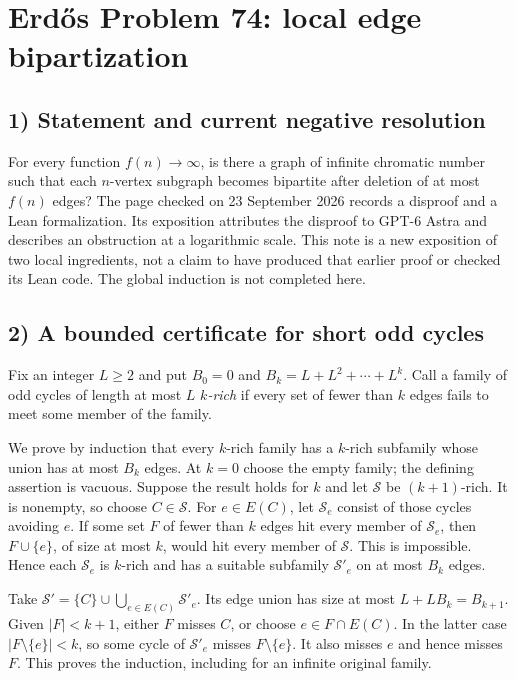 \section{Erd\H{o}s Problem 74: local edge bipartization}

\subsection{1) Statement and current negative resolution}
For every function $f(n)\to\infty$, is there a graph of infinite
chromatic number such that each $n$-vertex subgraph becomes bipartite
after deletion of at most $f(n)$ edges?
The page checked on 23 September 2026 records a disproof and a Lean
formalization. Its exposition attributes the disproof to GPT-6 Astra
and describes an obstruction at a logarithmic scale. This note is a
new exposition of two local ingredients, not a claim to have produced
that earlier proof or checked its Lean code. The global induction
is not completed here.

\subsection{2) A bounded certificate for short odd cycles}
Fix an integer $L\geq2$ and put $B_0=0$ and
$B_k=L+L^2+\cdots+L^k$. Call a family of odd cycles of length at
most $L$ \emph{$k$-rich} if every set of fewer than $k$ edges fails
to meet some member of the family.

We prove by induction that every $k$-rich family has a $k$-rich
subfamily whose union has at most $B_k$ edges. At $k=0$ choose the
empty family; the defining assertion is vacuous. Suppose the result
holds for $k$ and let $\mathcal S$ be $(k+1)$-rich. It is nonempty,
so choose $C\in\mathcal S$. For $e\in E(C)$, let
$\mathcal S_e$ consist of those cycles avoiding $e$.
If some set $F$ of fewer than $k$ edges hit every member of
$\mathcal S_e$, then $F\cup\{e\}$, of size at most $k$, would hit
every member of $\mathcal S$. This is impossible. Hence each
$\mathcal S_e$ is $k$-rich and has a suitable subfamily
$\mathcal S'_e$ on at most $B_k$ edges.

Take $\mathcal S'=\{C\}\cup\bigcup_{e\in E(C)}\mathcal S'_e$.
Its edge union has size at most $L+LB_k=B_{k+1}$. Given $|F|<k+1$,
either $F$ misses $C$, or choose $e\in F\cap E(C)$. In the latter
case $|F\setminus\{e\}|<k$, so some cycle of $\mathcal S'_e$
misses $F\setminus\{e\}$. It also misses $e$ and hence misses $F$.
This proves the induction, including for an infinite original family.

